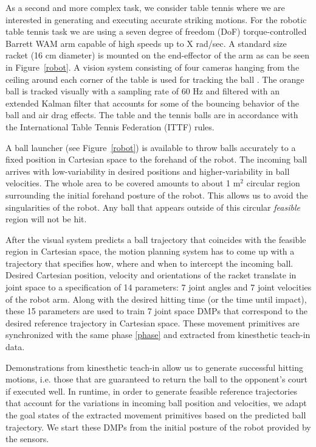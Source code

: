 As a second and more complex task, we consider table tennis where we are interested in generating and executing accurate striking motions. For the robotic table tennis task we are using a seven degree of freedom (DoF) torque-controlled Barrett WAM arm capable of high speeds up to X rad/sec. A standard size racket (16 cm diameter) is mounted on the end-effector of the arm as can be seen in Figure~\ref{robot}. A vision system consisting of four cameras hanging from the ceiling around each corner of the table is used for tracking the ball \cite{Lampert12}. The orange ball is tracked  visually with a sampling rate of 60 Hz and filtered with an extended Kalman filter that accounts for some of the bouncing behavior of the ball and air drag effects. The table and the tennis balls are in accordance with the International Table Tennis Federation (ITTF) rules.

A ball launcher (see Figure~\ref{robot}) is available to throw balls accurately to a fixed position in Cartesian space to the forehand of the robot. The incoming ball arrives with low-variability in desired positions and higher-variability in ball velocities. The whole area to be covered amounts to about 1 m$^2$ circular region surrounding the initial forehand posture of the robot. This allows us to avoid the singularities of the robot. Any ball that appears outside of this circular \emph{feasible} region will not be hit.

After the visual system predicts a ball trajectory that coincides with the feasible region in Cartesian space, the motion planning system has to come up with a trajectory that specifies how, where and when to intercept the incoming ball. Desired Cartesian position, velocity and orientations of the racket translate in joint space to a specification of 14 parameters: 7 joint angles and 7 joint velocities of the robot arm. Along with the desired hitting time (or the time until impact), these 15 parameters are used to train 7 joint space DMPs that correspond to the desired reference trajectory in Cartesian space. These movement primitives are synchronized with the same phase \eqref{phase} and extracted from kinesthetic teach-in data.

Demonstrations from kinesthetic teach-in allow us to generate successful hitting motions, i.e. those that are guaranteed to return the ball to the opponent's court if executed well. In runtime, in order to generate feasible reference trajectories that account for the variations in incoming ball position and velocities, we adapt the goal states of the extracted movement primitives based on the predicted ball trajectory. We start these DMPs from the initial posture of the robot provided by the sensors.

